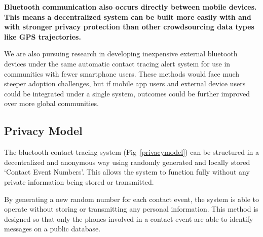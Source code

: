 \documentclass[11pt]{article}
\begin{document}
\textbf{Bluetooth communication also occurs directly between mobile devices. This means a decentralized system can be built more easily with and with stronger privacy protection than other crowdsourcing data types like GPS trajectories. }


We are also pursuing research in developing inexpensive external bluetooth devices under the same automatic contact tracing alert system for use in communities with fewer smartphone users. These methods would face much steeper adoption challenges, but if mobile app users and external device users could be integrated under a single system, outcomes could be further improved over more global communities. 

\subsection{Privacy Model}

The bluetooth contact tracing system (Fig~\ref{privacymodel}) can be structured in a decentralized and anonymous way using randomly generated and locally stored ‘Contact Event Numbers’. This allows the system to function fully without any private information being stored or transmitted. 

By generating a new random number for each contact event, the system is able to operate without storing or transmitting any personal information. This method is designed so that only the phones involved in a contact event are able to identify messages on a public database.
\end{document}
